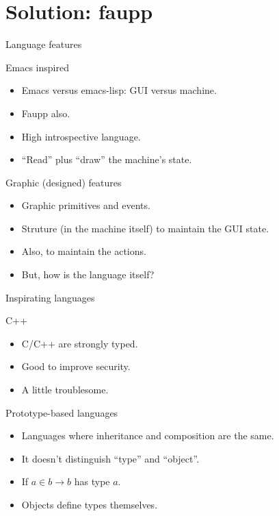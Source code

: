 \documentclass[12pt,xcolor=svgnames]{beamer}
\begin{document}
\section{Solution: faupp}

\begin{frame}{Language features}
  \begin{block}{Emacs inspired}
    \begin{itemize}
      \item Emacs versus emacs-lisp: GUI versus machine.
      \item Faupp also.
      \item High introspective language.
      \item ``Read'' plus ``draw'' the machine's state.
    \end{itemize}
  \end{block}

  \pause

  \begin{block}{Graphic (designed) features}
    \begin{itemize}
    \item Graphic primitives and events.
    \item Struture (in the machine itself) to maintain the GUI state.
    \item Also, to maintain the actions.
    \item But, how is the language itself?
    \end{itemize}
  \end{block}

\end{frame}

\begin{frame}{Inspirating languages}

  \begin{block}{C++}
    \begin{itemize}
      \item C/C++ are strongly typed.
      \item Good to improve security.
      \item A little troublesome.
    \end{itemize}
  \end{block}

  \pause

  \begin{block}{Prototype-based languages}
    \begin{itemize}
    \item Languages where inheritance and composition are the same.
    \item It doesn't distinguish ``type'' and ``object''.
    \item If $a \in b \rightarrow b$ has type $a$.
    \item Objects define types themselves.
    \end{itemize}
  \end{block}

\end{frame}
\end{document}
